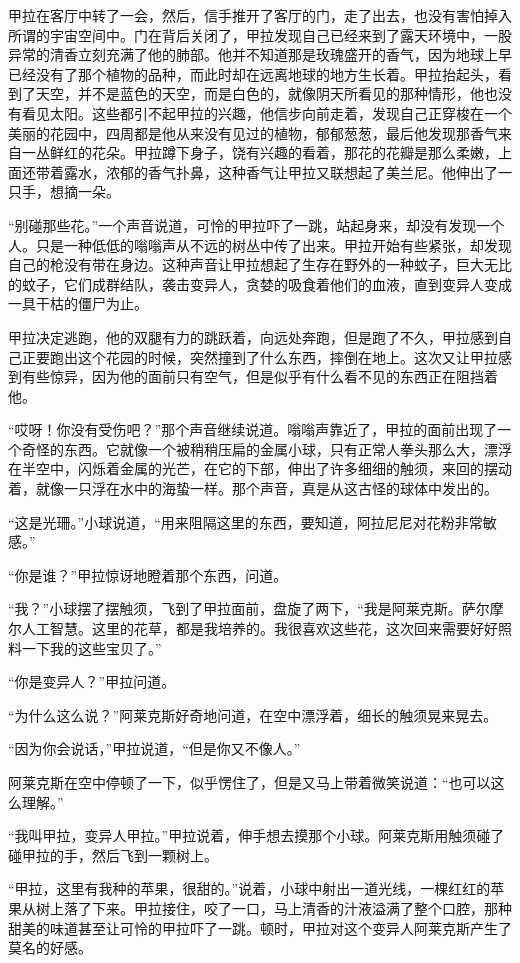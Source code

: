 甲拉在客厅中转了一会，然后，信手推开了客厅的门，走了出去，也没有害怕掉入所谓的宇宙空间中。门在背后关闭了，甲拉发现自己已经来到了露天环境中，一股异常的清香立刻充满了他的肺部。他并不知道那是玫瑰盛开的香气，因为地球上早已经没有了那个植物的品种，而此时却在远离地球的地方生长着。甲拉抬起头，看到了天空，并不是蓝色的天空，而是白色的，就像阴天所看见的那种情形，他也没有看见太阳。这些都引不起甲拉的兴趣，他信步向前走着，发现自己正穿梭在一个美丽的花园中，四周都是他从来没有见过的植物，郁郁葱葱，最后他发现那香气来自一丛鲜红的花朵。甲拉蹲下身子，饶有兴趣的看着，那花的花瓣是那么柔嫩，上面还带着露水，浓郁的香气扑鼻，这种香气让甲拉又联想起了美兰尼。他伸出了一只手，想摘一朵。

“别碰那些花。”一个声音说道，可怜的甲拉吓了一跳，站起身来，却没有发现一个人。只是一种低低的嗡嗡声从不远的树丛中传了出来。甲拉开始有些紧张，却发现自己的枪没有带在身边。这种声音让甲拉想起了生存在野外的一种蚊子，巨大无比的蚊子，它们成群结队，袭击变异人，贪婪的吸食着他们的血液，直到变异人变成一具干枯的僵尸为止。

甲拉决定逃跑，他的双腿有力的跳跃着，向远处奔跑，但是跑了不久，甲拉感到自己正要跑出这个花园的时候，突然撞到了什么东西，摔倒在地上。这次又让甲拉感到有些惊异，因为他的面前只有空气，但是似乎有什么看不见的东西正在阻挡着他。

“哎呀！你没有受伤吧？”那个声音继续说道。嗡嗡声靠近了，甲拉的面前出现了一个奇怪的东西。它就像一个被稍稍压扁的金属小球，只有正常人拳头那么大，漂浮在半空中，闪烁着金属的光芒，在它的下部，伸出了许多细细的触须，来回的摆动着，就像一只浮在水中的海蛰一样。那个声音，真是从这古怪的球体中发出的。

“这是光珊。”小球说道，“用来阻隔这里的东西，要知道，阿拉尼尼对花粉非常敏感。”

“你是谁？”甲拉惊讶地瞪着那个东西，问道。

“我？”小球摆了摆触须，飞到了甲拉面前，盘旋了两下，“我是阿莱克斯。萨尔摩尔人工智慧。这里的花草，都是我培养的。我很喜欢这些花，这次回来需要好好照料一下我的这些宝贝了。”

“你是变异人？”甲拉问道。

“为什么这么说？”阿莱克斯好奇地问道，在空中漂浮着，细长的触须晃来晃去。

“因为你会说话，”甲拉说道，“但是你又不像人。”

阿莱克斯在空中停顿了一下，似乎愣住了，但是又马上带着微笑说道：“也可以这么理解。”

“我叫甲拉，变异人甲拉。”甲拉说着，伸手想去摸那个小球。阿莱克斯用触须碰了碰甲拉的手，然后飞到一颗树上。

“甲拉，这里有我种的苹果，很甜的。”说着，小球中射出一道光线，一棵红红的苹果从树上落了下来。甲拉接住，咬了一口，马上清香的汁液溢满了整个口腔，那种甜美的味道甚至让可怜的甲拉吓了一跳。顿时，甲拉对这个变异人阿莱克斯产生了莫名的好感。

